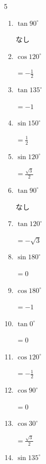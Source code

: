 \begin{multicols}{5}
\begin{enumerate}
  \item $\displaystyle \tan{90^\circ}$

        $\displaystyle なし$

  \item $\displaystyle \cos{120^\circ}$

        $\displaystyle =-\frac{1}{2}$

  \item $\displaystyle \tan{135^\circ}$

        $\displaystyle =-1$

  \item $\displaystyle \sin{150^\circ}$

        $\displaystyle =\frac{1}{2}$

  \item $\displaystyle \sin{120^\circ}$

        $\displaystyle =\frac{\sqrt{3}}{2}$

  \item $\displaystyle \tan{90^\circ}$

        $\displaystyle なし$

  \item $\displaystyle \tan{120^\circ}$

        $\displaystyle =-\sqrt{3}$

  \item $\displaystyle \sin{180^\circ}$

        $\displaystyle =0$

  \item $\displaystyle \cos{180^\circ}$

        $\displaystyle =-1$

  \item $\displaystyle \tan{0^\circ}$

        $\displaystyle =0$

  \item $\displaystyle \cos{120^\circ}$

        $\displaystyle =-\frac{1}{2}$

  \item $\displaystyle \cos{90^\circ}$

        $\displaystyle =0$

  \item $\displaystyle \cos{30^\circ}$

        $\displaystyle =\frac{\sqrt{3}}{2}$

  \item $\displaystyle \sin{135^\circ}$


\end{enumerate}
\end{multicols}
